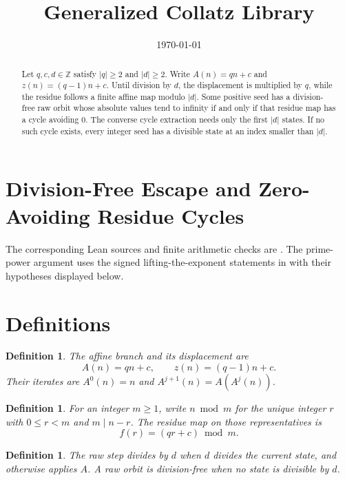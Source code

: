 \documentclass[11pt,letterpaper]{article}
\title{Generalized Collatz Library}
\author{}
\date{\today}
\newcommand{\Z}{\mathbb{Z}}
\newtheorem{definition}[theorem]{Definition}
\begin{document}
\maketitle
\section*{Division-Free Escape and Zero-Avoiding Residue Cycles}

\begin{abstract}
Let \(q,c,d\in\Z\) satisfy \(|q|\ge 2\) and \(|d|\ge 2\). Write \(A(n)=qn+c\) and \(z(n)=(q-1)n+c\). Until division by \(d\), the displacement is multiplied by \(q\), while the residue follows a finite affine map modulo \(|d|\). Some positive seed has a division-free raw orbit whose absolute values tend to infinity if and only if that residue map has a cycle avoiding \(0\). The converse cycle extraction needs only the first \(|d|\) states. If no such cycle exists, every integer seed has a divisible state at an index smaller than \(|d|\).
\end{abstract}

The corresponding Lean sources and finite arithmetic checks are
\cite{LibraryProfile26,LibraryPrimePower26,LibraryProfileChecks26}.
The prime-power argument uses the signed lifting-the-exponent statements
in \cite{MathlibMultiplicity26} with their hypotheses displayed below.

\section{Definitions}

\begin{definition}
The affine branch and its displacement are
\[
  A(n)=qn+c,
  \qquad
  z(n)=(q-1)n+c.
\]
Their iterates are \(A^{0}(n)=n\) and \(A^{j+1}(n)=A(A^{j}(n))\).
\end{definition}

\begin{definition}
For an integer \(m\ge 1\), write \(n\bmod m\) for the unique integer \(r\) with \(0\le r<m\) and \(m\mid n-r\). The residue map on those representatives is
\[
  f(r)=(qr+c)\bmod m.
\]
\end{definition}

\begin{definition}
The raw step divides by \(d\) when \(d\) divides the current state, and otherwise applies \(A\). A raw orbit is division-free when no state is divisible by \(d\).
\end{definition}
\end{document}
